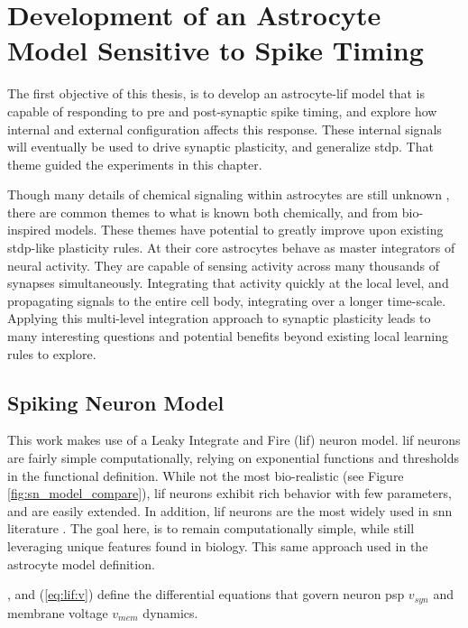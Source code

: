 %

\chapter{Development of an Astrocyte Model Sensitive to Spike Timing} \label{chapter:obj1}
The first objective of this thesis, is to develop an astrocyte-\gls{lif} model
that is capable of responding to pre and post-synaptic spike timing, and explore
how internal and external configuration affects this response. These internal
signals will eventually be used to drive synaptic plasticity, and generalize
\gls{stdp}. That theme guided the experiments in this chapter.

Though many details of chemical signaling within astrocytes are still unknown
\parencite{manninen_2018}, there are common themes to what is known both
chemically, and from bio-inspired models. These themes have potential to greatly
improve upon existing \gls{stdp}-like plasticity rules. At their core astrocytes
behave as master integrators of neural activity. They are capable of sensing
activity across many thousands of synapses simultaneously. Integrating that
activity quickly at the local level, and propagating signals to the entire cell
body, integrating over a longer time-scale. Applying this multi-level
integration approach to synaptic plasticity leads to many interesting questions
and potential benefits beyond existing local learning rules to explore.

\section{Spiking Neuron Model}
This work makes use of a Leaky Integrate and Fire (\gls{lif}) neuron model. \Gls{lif}
neurons are fairly simple computationally, relying on exponential functions
and thresholds in the functional definition. While not the most
bio-realistic (see Figure \ref{fig:sn_model_compare}), \gls{lif} neurons exhibit
rich behavior with few parameters, and are easily extended. In addition, \gls{lif}
neurons are the most widely used in \gls{snn} literature \parencite{ponulak_2011}. The
goal here, is to remain computationally simple, while still leveraging unique
features found in biology. This same approach used in the astrocyte model
definition.

, and (\ref{eq:lif:v}) define the differential equations that
govern neuron \gls{psp} $v_{syn}$ and membrane voltage $v_{mem}$
dynamics.

